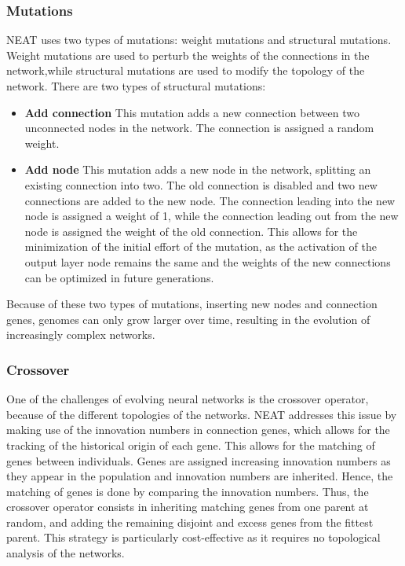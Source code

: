 \subsubsection{Mutations}

NEAT uses two types of mutations: weight mutations and structural mutations. Weight mutations are used to perturb the weights of the connections in the network,while
structural mutations are used to modify the topology of the network. There are two types of structural mutations:

\begin{itemize}
    \item \textbf{Add connection} This mutation adds a new connection between two unconnected nodes in the network. The connection is assigned a random weight.
    \item \textbf{Add node} This mutation adds a new node in the network, splitting an existing connection into two. The old connection is disabled and two new
        connections are added to the new node. The connection leading into the new node is assigned a weight of 1, while the connection leading out from the new node is
        assigned the weight of the old connection. This allows for the minimization of the initial effort of the mutation, as the activation of the output layer
        node remains the same and the weights of the new connections can be optimized in future generations.
\end{itemize}

Because of these two types of mutations, inserting new nodes and connection genes, genomes can only grow larger over time, resulting in the evolution of increasingly
complex networks.

\subsubsection{Crossover}

One of the challenges of evolving neural networks is the crossover operator, because of the different topologies of the networks. NEAT addresses this issue by making
use of the innovation numbers in connection genes, which allows for the tracking of the historical origin of each gene. This allows for the matching of genes between
individuals. Genes are assigned increasing innovation numbers as they appear in the population and innovation numbers are inherited. Hence, the matching of genes is done
by comparing the innovation numbers. Thus, the crossover operator consists in inheriting matching genes from one parent at random, and adding the remaining disjoint
and excess genes from the fittest parent. This strategy is particularly cost-effective as it requires no topological analysis of the networks.

